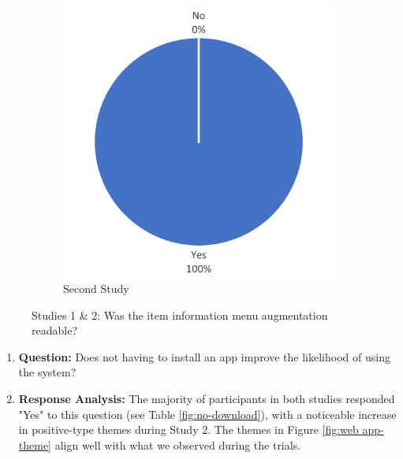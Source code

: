 \documentclass[thesis]{fputhesis}
\begin{document}
\begin{body}
\begin{figure}[h]
\begin{subfigure}[]{.45\textwidth}
        \includegraphics[width=\textwidth]{Images/readability study 2.png}
        \caption{Second Study}
        \label{fig:readability2}
    \end{subfigure}
    \caption{Studies 1 \& 2: Was the item information menu augmentation readable?}
    \label{fig:readability}
\end{figure}

\begin{enumerate}
    \item[] \textbf{Question: } Does not having to install an app improve the likelihood of using the system?
    \item[] \textbf{Response Analysis: } The majority of participants in both studies responded "Yes" to this question (see Table \ref{fig:no-download}), with a noticeable increase in positive-type themes during Study 2. The themes in Figure \ref{fig:web app-theme} align well with what we observed during the trials. 
\end{enumerate}


\end{body}
\end{document}
